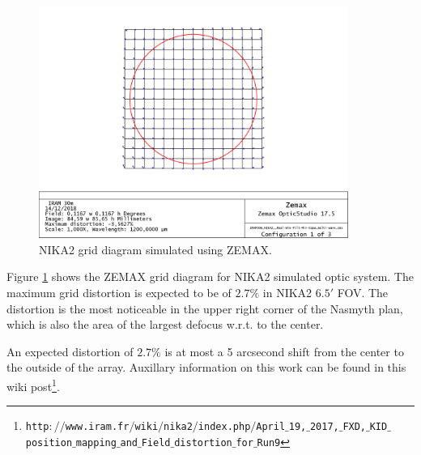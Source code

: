 \begin{figure}[ht] 
\begin{center}
  \includegraphics[width=0.9\textwidth]{Figures/NIKA2_Grid-distortion.png}
\caption[Simulated FOV grid]{NIKA2 grid diagram simulated using
  ZEMAX.  }
 \label{fig:fov_grid_distortion_zemax}
\end{center}
\end{figure}

Figure \ref{fig:fov_grid_distortion_zemax} shows the ZEMAX grid diagram for
NIKA2 simulated optic system. The maximum grid distortion is expected
to be of $2.7\%$ in NIKA2 $6.5'$ FOV. The distortion is the most
noticeable in the upper right corner of the Nasmyth plan, which is
also the area of the largest defocus w.r.t. to the center. 

An expected distortion of $2.7\%$ is at most a 5 arcsecond shift from the
center to the outside of the array.
Auxillary information on this work can be found in this wiki post\footnote{\tiny
  {\tt http$://$www.iram.fr$/$wiki$/$nika2$/$index.php$/$April$\_$19,$\_$2017,$\_$FXD,$\_$KID$\_$position$\_$mapping$\_$and$\_$Field$\_$distortion$\_$for$\_$Run9}}.

